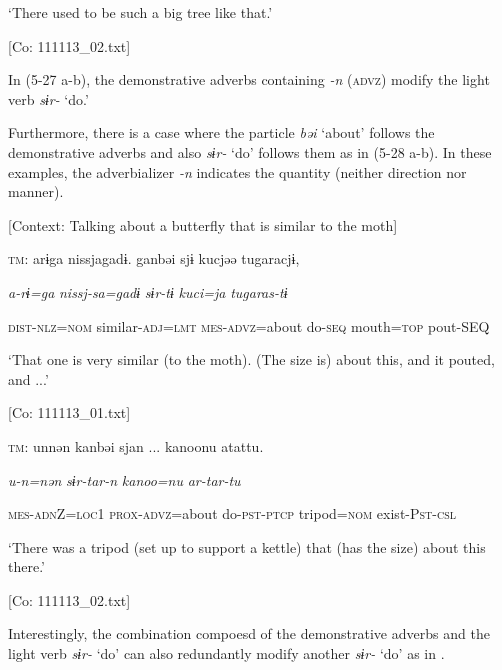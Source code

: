       ‘There used to be such a big tree like that.’

      [Co: 111113\_02.txt]
\z
\z

In (5-27 a-b), the demonstrative adverbs containing \textit{{}-n} (\textsc{advz}) modify the light verb \textit{sɨr-} ‘do.’

Furthermore, there is a case where the particle \textit{bəi} ‘about’ follows the demonstrative adverbs and also \textit{sɨr-} ‘do’ follows them as in (5-28 a-b). In these examples, the adverbializer \textit{{}-n} indicates the quantity (neither direction nor manner).

\ea \label{ex:5:28}  \ea \label{ex:5:28a} [Context: Talking about a butterfly that is similar to the moth]

    \textsc{tm}:  arɨga  nissjagadɨ.  ganbəi  sjɨ  kucjəə  tugaracjɨ,

      \textit{a-rɨ=ga}  \textit{nissj-sa=gadɨ}  \textit{}  \textit{sɨr-tɨ}  \textit{kuci=ja}  \textit{tugaras-tɨ}
                                                                                   
      \textsc{dist}-\textsc{nlz}=\textsc{nom}  similar-\textsc{adj}=\textsc{lmt}  \textsc{mes}-\textsc{advz}=about  do-\textsc{seq}     mouth=\textsc{top}  pout-SEQ

      ‘That one is very similar (to the moth). (The size is) about this, and it pouted, and ...’

      [Co: 111113\_01.txt]

 \ex \label{ex:5:b} \textsc{tm}:  unnən  kanbəi  sjan  ...   kanoonu  atattu.
                                                               
      \textit{u-n=nən}  \textit{}  \textit{sɨr-tar-n} \textit{kanoo=nu}  \textit{ar-tar-tu}     
                                                              
      \textsc{mes}-\textsc{adn}Z=\textsc{loc}1  \textsc{prox}-\textsc{advz}=about  do-\textsc{pst}-\textsc{ptcp}   tripod=\textsc{nom}  exist-P\textsc{st}-\textsc{csl}

      ‘There was a tripod (set up to support a kettle) that (has the size) about this there.’

      [Co: 111113\_02.txt]
\z
\z

Interestingly, the combination compoesd of the demonstrative adverbs and the light verb \textit{sɨr-} ‘do’ can also redundantly modify another \textit{sɨr-} ‘do’ as in .

